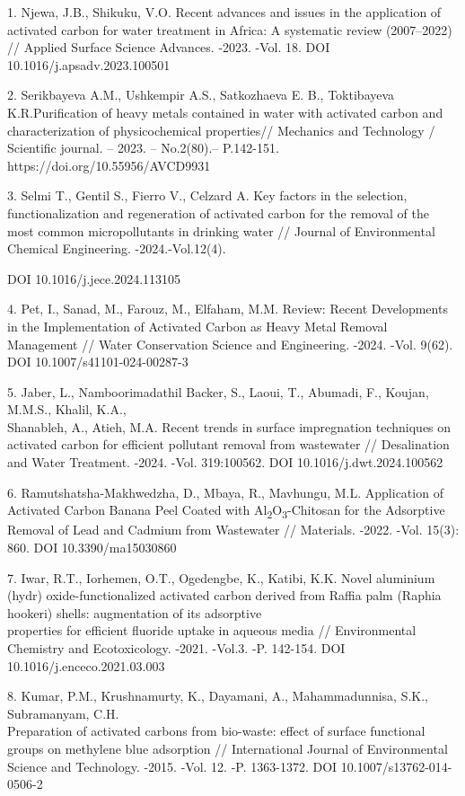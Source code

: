 \begin{references}
1. Njewa, J.B., Shikuku, V.O. Recent advances and issues in the
application of activated carbon for water treatment in Africa: A
systematic review (2007--2022) // Applied Surface Science Advances.
-2023. -Vol. 18. DOI 10.1016/j.apsadv.2023.100501

2. Serikbayeva A.M., Ushkempir A.S., Satkozhaeva E. B., Toktibayeva
K.R.Purification of heavy metals contained in water with activated
carbon and characterization of physicochemical properties// Mechanics
and Technology / Scientific journal. -- 2023. -- No.2(80).-- P.142-151.
https://doi.org/10.55956/AVCD9931

3. Selmi T., Gentil S., Fierro V., Celzard A. Key factors in the
selection, functionalization and regeneration of activated carbon for
the removal of the most common micropollutants in drinking water //
Journal of Environmental Chemical Engineering. -2024.-Vol.12(4).

DOI 10.1016/j.jece.2024.113105

4. Pet, I., Sanad, M., Farouz, M., Elfaham, M.M. Review: Recent
Developments in the Implementation of Activated Carbon as Heavy Metal
Removal Management // Water Conservation Science and Engineering. -2024.
-Vol. 9(62). DOI 10.1007/s41101-024-00287-3

5. Jaber, L., Namboorimadathil Backer, S., Laoui, T., Abumadi, F.,
Koujan, M.M.S., Khalil, K.A., \\Shanableh, A., Atieh, M.A. Recent trends
in surface impregnation techniques on activated carbon for efficient
pollutant removal from wastewater // Desalination and Water Treatment.
-2024. -Vol. 319:100562. DOI 10.1016/j.dwt.2024.100562

6. Ramutshatsha-Makhwedzha, D., Mbaya, R., Mavhungu, M.L. Application of
Activated Carbon Banana Peel Coated with
Al\textsubscript{2}O\textsubscript{3}-Chitosan for the Adsorptive
Removal of Lead and Cadmium from Wastewater // Materials. -2022. -Vol.
15(3): 860. DOI 10.3390/ma15030860

7. Iwar, R.T., Iorhemen, O.T., Ogedengbe, K., Katibi, K.K. Novel
aluminium (hydr) oxide-functionalized activated carbon derived from
Raffia palm (Raphia hookeri) shells: augmentation of its adsorptive\\
properties for efficient fluoride uptake in aqueous media //
Environmental Chemistry and Ecotoxicology. -2021. -Vol.3. -P. 142-154.
DOI 10.1016/j.enceco.2021.03.003

8. Kumar, P.M., Krushnamurty, K., Dayamani, A., Mahammadunnisa, S.K.,
Subramanyam, C.H. \\Preparation of activated carbons from bio-waste:
effect of surface functional groups on methylene blue adsorption //
International Journal of Environmental Science and Technology. -2015.
-Vol. 12. -P. 1363-1372. DOI 10.1007/s13762-014-0506-2


\end{references}
